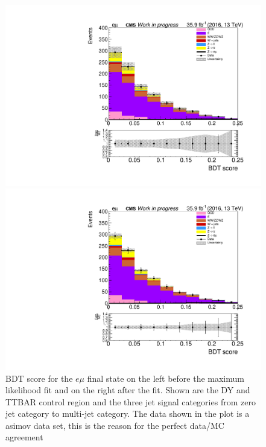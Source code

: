 \begin{figure}[htp]
	\begin{multicols}{2}
		\includegraphics[width=\linewidth]{plots/em/MultiJet_prefit.pdf}\par 
		\includegraphics[width=\linewidth]{plots/em/MultiJet_postfit.pdf}\par
	\end{multicols}		

	\caption[BDT score]{BDT score for the $e\mu$ final state on the left before the maximum likelihood fit and on the right after the fit. Shown are the \gls{DY} and \gls{TTBAR} control region and the three jet signal categories from zero jet category to multi-jet category. The data shown in the plot is a asimov data set, this is the reason for the perfect data/MC agreement}
	\label{fig:FITS}
\end{figure}

